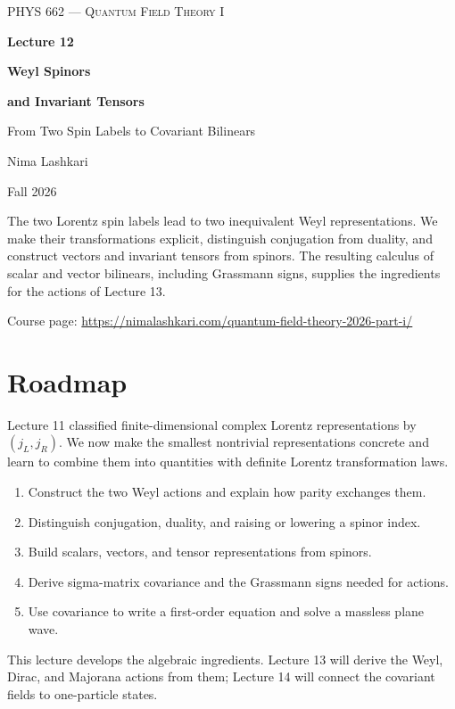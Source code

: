 \documentclass[11pt]{article}
\begin{document}
\begin{titlepage}
\centering
\vspace*{1.2in}
{\scshape\Large PHYS 662 --- Quantum Field Theory I\par}
\vspace{0.35in}
{\Huge\bfseries\color{qftblue} Lecture 12\par}
\vspace{0.15in}
{\LARGE\bfseries Weyl Spinors\par}
\vspace{0.06in}
{\LARGE\bfseries and Invariant Tensors\par}
\vspace{0.16in}
{\large\color{qftgreen} From Two Spin Labels to Covariant Bilinears\par}
\vspace{0.6in}
{\large Nima Lashkari\par}
{\large Fall 2026\par}
\vfill
\begin{minipage}{0.86\textwidth}\small
The two Lorentz spin labels lead to two inequivalent Weyl representations.
We make their transformations explicit, distinguish conjugation from
duality, and construct vectors and invariant tensors from spinors.
The resulting calculus of scalar and vector bilinears, including
Grassmann signs, supplies the ingredients for the actions of Lecture 13.

\medskip
Course page: \url{https://nimalashkari.com/quantum-field-theory-2026-part-i/}
\end{minipage}
\vspace{0.5in}
\end{titlepage}
\begingroup\small\tableofcontents\endgroup
\newpage
{}

\section*{Roadmap}
Lecture 11 classified finite-dimensional complex Lorentz representations
by \((j_L,j_R)\). We now make the smallest nontrivial representations
concrete and learn to combine them into quantities with definite
Lorentz transformation laws.
\begin{enumerate}
\item Construct the two Weyl actions and explain how parity exchanges them.
\item Distinguish conjugation, duality, and raising or lowering a spinor index.
\item Build scalars, vectors, and tensor representations from spinors.
\item Derive sigma-matrix covariance and the Grassmann signs needed for actions.
\item Use covariance to write a first-order equation and solve a massless plane wave.
\end{enumerate}
This lecture develops the algebraic ingredients. Lecture 13 will derive
the Weyl, Dirac, and Majorana actions from them; Lecture 14 will connect
the covariant fields to one-particle states.
\end{document}
